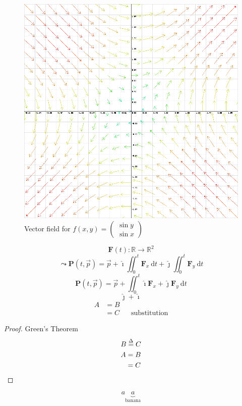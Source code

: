 \documentclass[a4paper, 12pt]{article} %
\newcommand{\ihat}{\hat{\imath}} %
\newcommand{\jhat}{\hat{\jmath}} %
\newcommand{\fatf}{\mathbf{F}} %
\newcommand{\definedas}{\stackrel{\Delta}{=}} %
\begin{document}
\newpage
\begin{figure}
	\includegraphics[scale=0.45]{sin.png}
	\centering
	\caption{Vector field for $f(x,y)=\begin{pmatrix}\sin y\\\sin x\end{pmatrix}$}
	\label{fig:Banana}
\end{figure}
$$\fatf(t):\mathbb{R}\rightarrow\mathbb{R}^2$$
$$\leadsto\mathbf{P}(t, \vec{p})=\vec{p}+\hat{\imath}\iint_0^t\fatf_x\ \mathrm{d}t+\hat{\jmath}\iint_0^t\fatf_y\ \mathrm{d}t$$
$$\mathbf{P}(t, \vec{p})=\vec{p}+\iint_0^t\hat{\imath}\fatf_x+\hat{\jmath}\fatf_y\ \mathrm{d}t$$
$$\jhat+\ihat$$
\begin{align*}
	A&=B\\
	 &=C && \text{substitution}
\end{align*}
\begin{proof} Green's Theorem
	\begin{align*}
		B \definedas C \span \\
		A&=B \\
		 &=C \\
	\end{align*}
\end{proof}
$$a\underbrace{a}_\text{banana}$$
\end{document}
